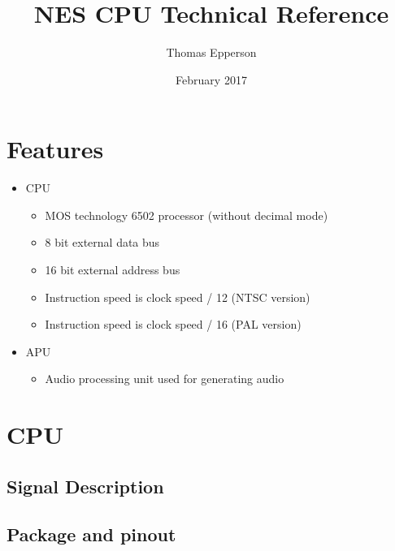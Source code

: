 \documentclass[letterpaper,12pt,twoside]{book}
\begin{document}
\title{NES CPU Technical Reference}
\author{Thomas Epperson}
\date{February 2017}
\maketitle
\newpage
\tableofcontents
\newpage
\chapter{Features}
\begin{itemize}
\item CPU
\begin{itemize}
\item MOS technology 6502 processor (without decimal mode)
\item 8 bit external data bus
\item 16 bit external address bus
\item Instruction speed is clock speed / 12 (NTSC version) 
\item Instruction speed is clock speed / 16 (PAL version) 
\end{itemize}
\item APU
\begin{itemize}
\item Audio processing unit used for generating audio
\end{itemize}
\end{itemize}
\chapter{CPU}
\section{Signal Description}
\section{Package and pinout}
\end{document}
